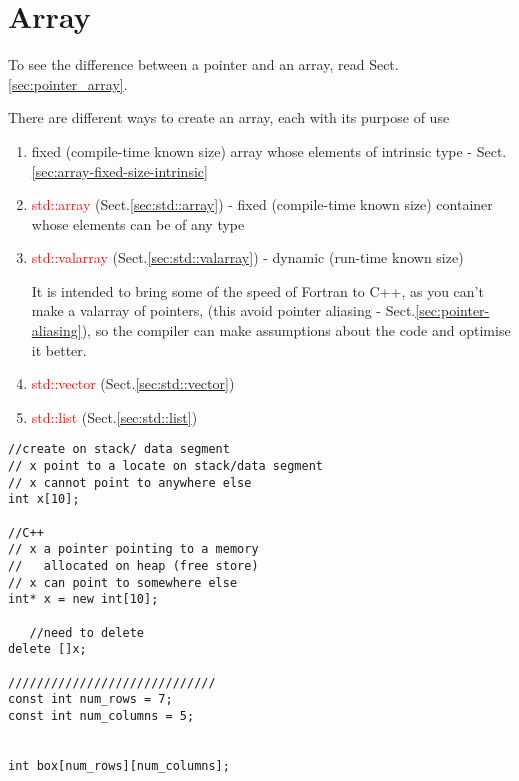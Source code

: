 \chapter{Array}
\label{sec:array}

To see the difference between a pointer and an array, read
Sect.\ref{sec:pointer_array}.

There are different ways to create an array, each with its purpose of use
\begin{enumerate}
  \item fixed (compile-time known size) array whose elements of intrinsic type -
  Sect.\ref{sec:array-fixed-size-intrinsic}
  
  \item \textcolor{red}{std::array} (Sect.\ref{sec:std::array}) - fixed (compile-time known size)
  container whose elements can be of any type
  
  \item \textcolor{red}{std::valarray} (Sect.\ref{sec:std::valarray}) - dynamic (run-time known size)
   
  It is intended to bring some of the speed of Fortran to C++, as you can't make
  a valarray of pointers, (this avoid pointer aliasing -
  Sect.\ref{sec:pointer-aliasing}), so the compiler can make assumptions about
  the code and optimise it better.
   
   
  \item \textcolor{red}{std::vector} (Sect.\ref{sec:std::vector})
  
  
  \item \textcolor{red}{std::list} (Sect.\ref{sec:std::list})
\end{enumerate}
\begin{verbatim}
//create on stack/ data segment
// x point to a locate on stack/data segment
// x cannot point to anywhere else
int x[10];

//C++
// x a pointer pointing to a memory 
//   allocated on heap (free store)
// x can point to somewhere else
int* x = new int[10];
  
   //need to delete
delete []x;

/////////////////////////////
const int num_rows = 7;
const int num_columns = 5;


int box[num_rows][num_columns];
\end{verbatim}

